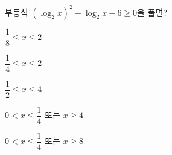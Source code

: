 부등식 $(\log_2 x)^{2}-\log_2 x-6\ge 0$을 풀면?
\begin{choicesii}{\rule[-3ex]{0pt}{8ex}$\dfrac{1}{8}\le x\le 2$}{\rule[-3ex]{0pt}{8ex}$\dfrac{1}{4}\le x\le 2$}{\rule[-3ex]{0pt}{8ex}$\dfrac{1}{2}\le x\le 4$}{\rule[-3ex]{0pt}{8ex}$0<x\le\dfrac{1}{4}$ 또는 $x\ge 4$}{\rule[-3ex]{0pt}{8ex}$0<x\le\dfrac{1}{4}$ 또는 $x\ge 8$}\end{choicesii}
